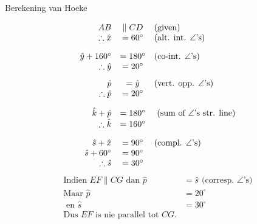 \begin{wex}{Berekening van Hoeke}
{\begin{center}
{}
 \end{center}
} 
{

\begin{equation*}
\begin{array}{rcl}
AB &\parallel CD & \mbox{(given)} \\
\therefore \hat{x}&=60^{\circ} & \mbox{(alt. int. $\angle$'s)}  \vspace{10pt} \\

\hat{y} + 160^\circ &= 180^{\circ}  & \mbox{(co-int. $\angle$'s)} \\
\therefore \hat{y} &= 20^{\circ} &   \vspace{8pt}\\


\hat{p} &= \hat{y} & \mbox{(vert. opp. $\angle$'s)} \\
\therefore \hat{p} &= 20^{\circ} &  \vspace{10pt}\\



 \hat{k} + \hat{p} &= 180^{\circ}  &\mbox{ (sum of $\angle$'s str. line)} \\
\therefore \hat{k} &= 160^{\circ} &  \vspace{10pt}\\


 \hat{s} + \hat{x} &= 90^{\circ}  & \mbox{(compl. $\angle$'s)} \\ 
 \hat{s} + 60^\circ &= 90^{\circ} & \\
\therefore \hat{s} &= 30^{\circ} &  
\end{array}
\end{equation*} 
\begin{equation*}
\begin{array}{rl}
\mbox{Indien }EF \parallel CG \mbox{ dan } \hat{p} &= \hat{s} \mbox{ (corresp. $\angle$'s)} \\
\mbox{Maar }\hat{p} &= 20^{\circ} \\
\mbox{ en } \hat{s}&= 30^{\circ} \\
\mbox{Dus }EF \mbox{ is nie parallel tot } CG.&
\end{array}
\end{equation*} 
}
\end{wex}


